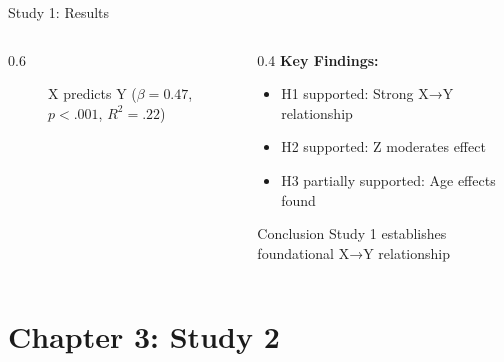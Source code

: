 \documentclass[aspectratio=169,12pt]{beamer}
\begin{document}
\begin{frame}{Study 1: Results}
  \begin{columns}[c]

    \begin{column}{0.6\textwidth}
      \begin{figure}
        \centering
        \caption{X predicts Y ($\beta = 0.47$, $p < .001$, $R^2 = .22$)}
      \end{figure}
    \end{column}

    \begin{column}{0.4\textwidth}
      \textbf{Key Findings:}
      \begin{itemize}
        \item H1 supported: Strong X→Y relationship
        \item H2 supported: Z moderates effect
        \item H3 partially supported: Age effects found
      \end{itemize}

      \vspace{0.5cm}

      \begin{block}{Conclusion}
        Study 1 establishes foundational X→Y relationship
      \end{block}
    \end{column}

  \end{columns}
\end{frame}


\section{Chapter 3: Study 2}
\end{document}

